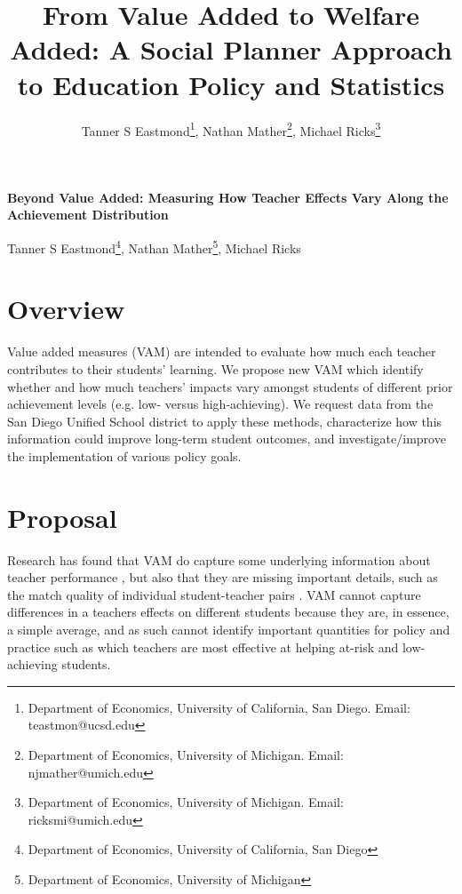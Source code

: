 \documentclass[letterpaper,12pt]{article}
\title{From Value Added to Welfare Added: A Social Planner Approach to Education Policy and Statistics}
\author{
Tanner S Eastmond\thanks{Department of Economics, University of California, San Diego. Email: teastmon@ucsd.edu}, Nathan Mather\thanks{Department of Economics, University of Michigan. Email: njmather@umich.edu }, Michael Ricks\thanks{Department of Economics, University of Michigan. Email: ricksmi@umich.edu}}
\date{\vspace{-8ex}}
\begin{document}
\begin{center}
\noindent \textbf{Beyond Value Added: Measuring How Teacher Effects Vary Along the Achievement Distribution}

Tanner S Eastmond\footnote{Department of Economics, University of California, San Diego}, Nathan Mather\footnote{\label{1}Department of Economics, University of Michigan}, Michael Ricks\footnotemark[\ref{1}]
\end{center}



\section{Overview}
\vspace{-12pt}
Value added measures (VAM) are intended to evaluate how much each teacher contributes to their students' learning.  We propose new VAM which identify whether and how much teachers' impacts vary amongst students of different prior achievement levels (e.g. low- versus high-achieving). We request data from the San Diego Unified School district to apply these methods, characterize how this information could improve long-term student outcomes, and investigate/improve the implementation of various policy goals.



\section{Proposal}
\vspace{-12pt}
Research has found that VAM do capture some underlying information about teacher performance \citep{chetty2014measuring2,pope2017multidimensional}, but also that they are missing important details, such as the match quality of individual student-teacher pairs \citep{dee2005teacher}. VAM cannot capture differences in a teachers effects on different students because they are, in essence, a simple average, and as such cannot identify important quantities for policy and practice such as which teachers are most effective at helping at-risk and low-achieving students.
\end{document}
